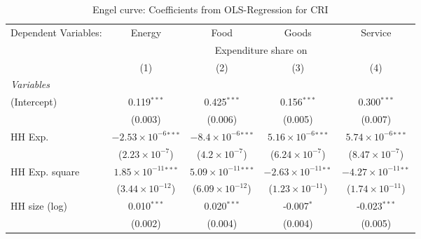 
\begin{table}[htbp!]
   \centering
   \small
   \begin{adjustbox}{width = 1\textwidth, max height = 0.95\textheight, center}
      \begin{threeparttable}[b]
         \caption{\label{tab:Engel_parametric_CRI} Engel curve: Coefficients from OLS-Regression for CRI}
         \begin{tabular}{lcccc}
            \tabularnewline \midrule \midrule
            Dependent Variables: & Energy                         & Food                           & Goods                          & Service\\  
             & \multicolumn{4}{c}{Expenditure share on} \\ 
                                 & (1)                            & (2)                            & (3)                            & (4)\\  
            \midrule
            \emph{Variables}\\
            (Intercept)          & 0.119$^{***}$                  & 0.425$^{***}$                  & 0.156$^{***}$                  & 0.300$^{***}$\\   
                                 & (0.003)                        & (0.006)                        & (0.005)                        & (0.007)\\   
            HH Exp.              & $-2.53\times 10^{-6}$$^{***}$  & $-8.4\times 10^{-6}$$^{***}$   & $5.16\times 10^{-6}$$^{***}$   & $5.74\times 10^{-6}$$^{***}$\\    
                                 & ($2.23\times 10^{-7}$)         & ($4.2\times 10^{-7}$)          & ($6.24\times 10^{-7}$)         & ($8.47\times 10^{-7}$)\\    
            HH Exp. square       & $1.85\times 10^{-11}$$^{***}$  & $5.09\times 10^{-11}$$^{***}$  & $-2.63\times 10^{-11}$$^{**}$  & $-4.27\times 10^{-11}$$^{**}$\\    
                                 & ($3.44\times 10^{-12}$)        & ($6.09\times 10^{-12}$)        & ($1.23\times 10^{-11}$)        & ($1.74\times 10^{-11}$)\\    
            HH size (log)        & 0.010$^{***}$                  & 0.020$^{***}$                  & -0.007$^{*}$                   & -0.023$^{***}$\\   
                                 & (0.002)                        & (0.004)                        & (0.004)                        & (0.005)\\   

\end{tabular}
\end{threeparttable}
\end{adjustbox}
\end{table}
